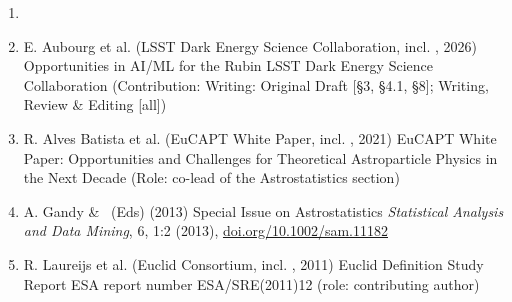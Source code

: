 \begin{enumerate}

\item 
{}

\item
\paper
{E. Aubourg et al. (LSST Dark Energy Science Collaboration, incl. \rt, 2026)}
{Opportunities in AI/ML for the Rubin LSST Dark Energy Science Collaboration}
{ (Contribution: Writing: Original Draft [§3, §4.1, §8]; Writing, Review \& Editing [all])}


\item
\paper
{R. Alves Batista et al. (EuCAPT White Paper, incl. \rt, 2021)}
{EuCAPT White Paper: Opportunities and Challenges for Theoretical Astroparticle Physics in the Next Decade}
{ (Role: co-lead of the Astrostatistics section)}

\item 
\paper
{A. Gandy \& \rt\ (Eds) (2013)}
{Special Issue on Astrostatistics}
{{\em Statistical Analysis and Data Mining}, 6, 1:2 (2013), \href{https://doi.org/10.1002/sam.11182}{doi.org/10.1002/sam.11182}}

\item  
\fourstars \paper
 {R. Laureijs et al. (Euclid Consortium, incl. \rt, 2011)}
{Euclid Definition Study Report}
{ESA report number ESA/SRE(2011)12}
{ (role: contributing author)}

\end{enumerate}
\setcounter{nWhitePapers}{\value{enumi}}




\vspace{\baselineskip}

